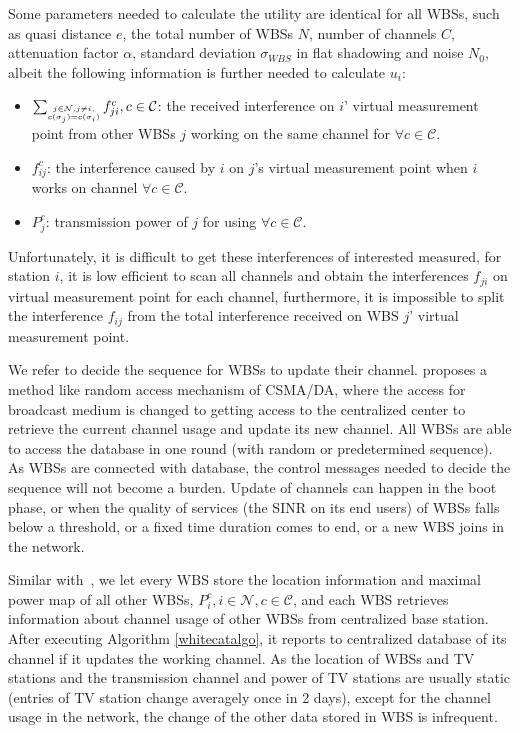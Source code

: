 Some parameters needed to calculate the utility are identical for all WBSs, such as quasi distance $e$, the total number of WBSs $N$, number of channels $C$, attenuation factor $\alpha$, standard deviation $\sigma_{WBS}$ in flat shadowing and noise $N_0$, albeit the following information is further needed to calculate $u_i$: 
	\begin{itemize} %
	\item $\sum_{\tiny\substack{j\in \mathcal{N}, j\ne i,\\ c(\sigma_j)=c(\sigma_i)}}f_{ji}^c, c\in \mathcal{C}$: the received interference on $i$' virtual measurement point from other WBSs $j$ working on the same channel for $\forall c\in \mathcal{C}$.
	\item $ f_{ij}^c$: the interference caused by $i$ on $j$'s virtual measurement point when $i$ works on channel $\forall c\in \mathcal{C}$.
	\item $P_j^c$: transmission power of $j$ for using $\forall c\in \mathcal{C}$.
	\end{itemize}
Unfortunately, it is difficult to get these interferences of interested measured, for station $i$, it is low efficient to scan all channels and obtain the interferences $f_{ji}$ on virtual measurement point for each channel, furthermore, it is impossible to split the interference $f_{ij}$ from the total interference received on WBS $j$' virtual measurement point. 

We refer \cite{CApotentialLearning_05dyspan} to decide the sequence for WBSs to update their channel. \cite{CApotentialLearning_05dyspan} proposes a method like random access mechanism of CSMA/DA, where the access for broadcast medium is changed to getting access to the centralized center to retrieve the current channel usage and update its new channel. All WBSs are able to access the database in one round (with random or predetermined sequence). As WBSs are connected with database, the control messages needed to decide the sequence will not become a burden. Update of channels can happen in the boot phase, or when the quality of services (the SINR on its end users) of WBSs falls below a threshold, or a fixed time duration comes to end, or a new WBS joins in the network. 

Similar with~\cite{SenseLess2011}, we let every WBS store the location information and maximal power map of all other WBSs, \ie $P_i^c, i\in\mathcal{N}, c\in\mathcal{C}$, and each WBS retrieves information about channel usage of other WBSs from centralized base station.
After executing Algorithm \ref{whitecatalgo}, it reports to centralized database of its channel if it updates the working channel.
As the location of WBSs and TV stations and the transmission channel and power of TV stations are usually static (entries of TV station change averagely once in 2 days\cite{SenseLess2011}), except for the channel usage in the network, the change of the other data stored in WBS is infrequent. 


